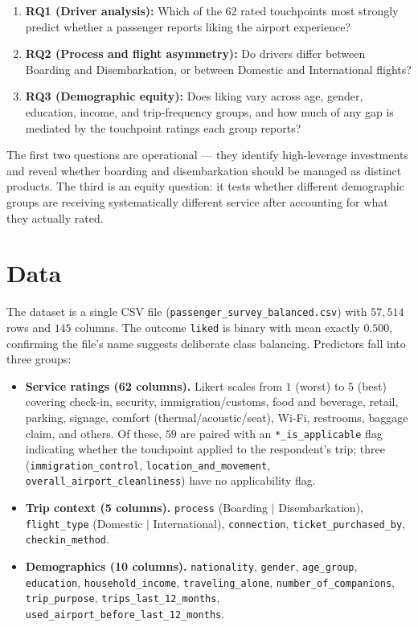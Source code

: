 \documentclass[11pt]{article}
\begin{document}
\begin{enumerate}
\item \textbf{RQ1 (Driver analysis):} Which of the $62$ rated touchpoints most strongly predict whether a passenger reports liking the airport experience?
\item \textbf{RQ2 (Process and flight asymmetry):} Do drivers differ between Boarding and Disembarkation, or between Domestic and International flights?
\item \textbf{RQ3 (Demographic equity):} Does liking vary across age, gender, education, income, and trip-frequency groups, and how much of any gap is mediated by the touchpoint ratings each group reports?
\end{enumerate}

The first two questions are operational --- they identify high-leverage investments and reveal whether boarding and disembarkation should be managed as distinct products. The third is an equity question: it tests whether different demographic groups are receiving systematically different service after accounting for what they actually rated.

\section{Data}
\label{sec:data}

The dataset is a single CSV file (\texttt{passenger\_survey\_balanced.csv}) with $57{,}514$ rows and $145$ columns. The outcome \texttt{liked} is binary with mean exactly $0.500$, confirming the file's name suggests deliberate class balancing. Predictors fall into three groups:

\begin{itemize}
\item \textbf{Service ratings (62 columns).} Likert scales from $1$ (worst) to $5$ (best) covering check-in, security, immigration/customs, food and beverage, retail, parking, signage, comfort (thermal/acoustic/seat), Wi-Fi, restrooms, baggage claim, and others. Of these, $59$ are paired with an \texttt{*\_is\_applicable} flag indicating whether the touchpoint applied to the respondent's trip; three (\texttt{immigration\_control}, \texttt{location\_and\_movement}, \texttt{overall\_airport\_cleanliness}) have no applicability flag.
\item \textbf{Trip context (5 columns).} \texttt{process} (Boarding $\mid$ Disembarkation), \texttt{flight\_type} (Domestic $\mid$ International), \texttt{connection}, \texttt{ticket\_purchased\_by}, \texttt{checkin\_method}.
\item \textbf{Demographics (10 columns).} \texttt{nationality}, \texttt{gender}, \texttt{age\_group}, \texttt{education}, \texttt{household\_income}, \texttt{traveling\_alone}, \texttt{number\_of\_companions}, \texttt{trip\_purpose}, \texttt{trips\_last\_12\_months}, \texttt{used\_airport\_before\_last\_12\_months}.
\end{itemize}
\end{document}
